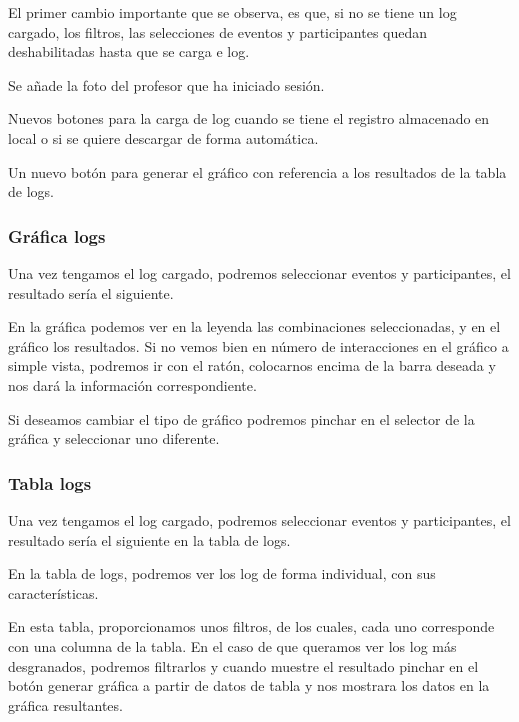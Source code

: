 El primer cambio importante que se observa, es que, si no se tiene un log cargado, los filtros, las selecciones de eventos y participantes quedan deshabilitadas hasta que se carga e log.

Se añade la foto del profesor que ha iniciado sesión.

Nuevos botones para la carga de log cuando se tiene el registro almacenado en local o si se quiere descargar de forma automática.

Un nuevo botón para generar el gráfico con referencia a los resultados de la tabla de logs.

\subsubsection{Gráfica logs}\label{grafica-logs}

Una vez tengamos el log cargado, podremos seleccionar eventos y participantes, el resultado sería el siguiente.


En la gráfica podemos ver en la leyenda las combinaciones seleccionadas, y en el gráfico los resultados. Si no vemos bien en número de interacciones en el gráfico a simple vista, podremos ir con el ratón, colocarnos encima de la barra deseada y nos dará la información correspondiente.

Si deseamos cambiar el tipo de gráfico podremos pinchar en el selector de la gráfica y seleccionar uno diferente.

\subsubsection{Tabla logs}\label{tabla-logs}

Una vez tengamos el log cargado, podremos seleccionar eventos y participantes, el resultado sería el siguiente en la tabla de logs.


En la tabla de logs, podremos ver los log de forma individual, con sus características.

En esta tabla, proporcionamos unos filtros, de los cuales, cada uno corresponde con una columna de la tabla. En el caso de que queramos ver los log más desgranados, podremos filtrarlos y cuando muestre el resultado pinchar en el botón generar gráfica a partir de datos de tabla y nos mostrara los datos en la gráfica resultantes.



















